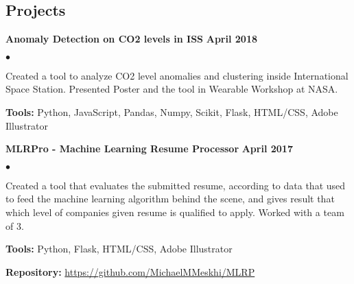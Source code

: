 \documentclass[margin,line]{res}
\newenvironment{list2}{
  \begin{list}{$\bullet$}{%
      \setlength{\itemsep}{0in}
      \setlength{\parsep}{0in} \setlength{\parskip}{0in}
      \setlength{\topsep}{0in} \setlength{\partopsep}{0in} 
      \setlength{\leftmargin}{0.2in}}}{\end{list}}
\begin{document}
\begin{resume}
%

%



\section{\sc Projects}

{\bf Anomaly Detection on CO2 levels in ISS} \hfill {\bf April 2018}\\
\vspace{-.3cm}
\begin{list2}
\item Created a tool to analyze CO2 level anomalies and clustering inside International Space Station. Presented Poster and the tool in Wearable Workshop at NASA.
\item \textbf{Tools:} Python, JavaScript, Pandas, Numpy, Scikit, Flask, HTML/CSS, Adobe Illustrator
\end{list2}


{\bf MLRPro - Machine Learning Resume Processor} \hfill {\bf April 2017}\\
\vspace{-.3cm}
\begin{list2}
\item Created a tool that evaluates the submitted resume, according to data that used to feed the machine learning algorithm behind the scene, and gives result that which level of companies given resume is qualified to apply. Worked with a team of 3.
\item \textbf{Tools:} Python, Flask, HTML/CSS, Adobe Illustrator
\item \textbf{Repository:} \href{https://github.com/MichaelMMeskhi/MLRP}{https://github.com/MichaelMMeskhi/MLRP}
\end{list2}


\end{resume}
\end{document}
